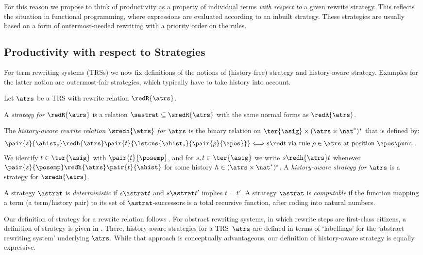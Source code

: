 For this reason we propose to think of productivity as
a property of individual terms 
\emph{with respect to} a given rewrite strategy.
This reflects the situation in functional programming,
where expressions are evaluated according to an inbuilt strategy.
These strategies are usually based on a form of outermost-needed rewriting 
with a priority order on the rules.


\subsection{Productivity with respect to Strategies}
  \label{sec:productivity:subsec:strategies}

For term rewriting systems (TRSs) \cite{terese:2003}
we now fix definitions of the notions of 
(history-free) strategy and history-aware strategy.
Examples for the latter notion are outermost-fair strategies,
which typically have to take history into account.


\begin{definition}\normalfont
Let $\atrs$ be a TRS with rewrite relation $\redR{\atrs}$.

  A \emph{strategy for $\redR{\atrs}$} is a relation 
  $\sastrat\subseteq\sredR{\atrs}$ with the same normal forms
  as $\redR{\atrs}$.

  The \emph{history-aware rewrite relation $\sredh{\atrs}$ for $\atrs$}
  is the binary relation on $\ter{\asig} \times (\atrs \times \nat^*)^*$ 
  that is defined by:
\begin{align*}
\pair{s}{\ahist_s} \redh{\atrs} \pair{t}{\lstcns{\ahist_s}{\pair{\rho}{\apos}}} &\Longleftrightarrow
    s \red t \text{ via rule $\rho \in \atrs$ at position $\apos$}
    \punc.
\end{align*}
We identify $t \in \ter{\asig}$ with $\pair{t}{\posemp}$,
  and for $s,t \in \ter{\asig}$ we write $s \redh{\atrs} t$ 
  whenever $\pair{s}{\posemp} \redh{\atrs} \pair{t}{\ahist}$ for some history $h \in (\atrs \times \nat^*)^*$.
A \emph{history-aware strategy for $\atrs$} is a strategy for
  $\sredh{\atrs}$.

  A strategy $\astrat$ is \emph{deterministic} if 
  $s \astrat t$ and $s \astrat t'$ implies $t = t'$. 
  A strategy $\astrat$ is \emph{computable} if the function mapping
  a term (a term/history pair) to its set of $\astrat$-successors
  is a total recursive function, after coding into natural numbers. 
\end{definition}

\begin{remark}
Our definition of strategy for a rewrite relation
  follows \cite{toya:1992}.
  For abstract rewriting systems, 
  in which rewrite steps are first-class citizens,
  a definition of strategy is given in \cite[Ch.\,9]{terese:2003}.
  There, history-aware strategies for a TRS~$\atrs$ are defined in terms of 
  `labellings' for the `abstract rewriting system' underlying $\atrs$.
  While that approach is conceptually advantageous, our definition
  of history-aware strategy is equally expressive.  
\end{remark}

